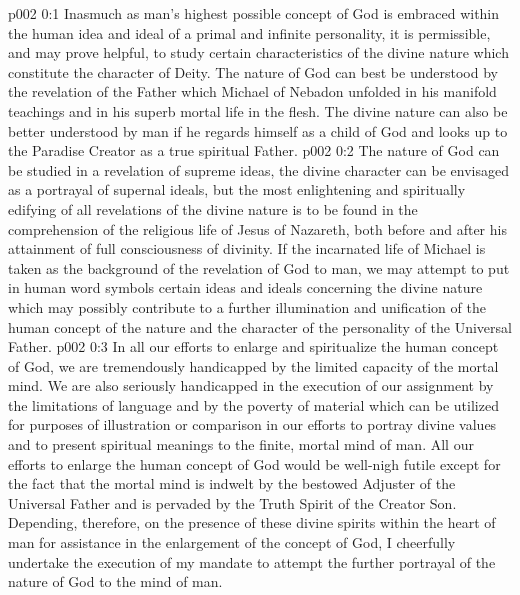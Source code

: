 \author{Divine Counsellor}
\vs p002 0:1 Inasmuch as man’s highest possible concept of God is embraced within the human idea and ideal of a primal and infinite personality, it is permissible, and may prove helpful, to study certain characteristics of the divine nature which constitute the character of Deity. The nature of God can best be understood by the revelation of the Father which Michael of Nebadon unfolded in his manifold teachings and in his superb mortal life in the flesh. The divine nature can also be better understood by man if he regards himself as a child of God and looks up to the Paradise Creator as a true spiritual Father.
\vs p002 0:2 The nature of God can be studied in a revelation of supreme ideas, the divine character can be envisaged as a portrayal of supernal ideals, but the most enlightening and spiritually edifying of all revelations of the divine nature is to be found in the comprehension of the religious life of Jesus of Nazareth, both before and after his attainment of full consciousness of divinity. If the incarnated life of Michael is taken as the background of the revelation of God to man, we may attempt to put in human word symbols certain ideas and ideals concerning the divine nature which may possibly contribute to a further illumination and unification of the human concept of the nature and the character of the personality of the Universal Father.
\vs p002 0:3 In all our efforts to enlarge and spiritualize the human concept of God, we are tremendously handicapped by the limited capacity of the mortal mind. We are also seriously handicapped in the execution of our assignment by the limitations of language and by the poverty of material which can be utilized for purposes of illustration or comparison in our efforts to portray divine values and to present spiritual meanings to the finite, mortal mind of man. All our efforts to enlarge the human concept of God would be well\hyp{}nigh futile except for the fact that the mortal mind is indwelt by the bestowed Adjuster of the Universal Father and is pervaded by the Truth Spirit of the Creator Son. Depending, therefore, on the presence of these divine spirits within the heart of man for assistance in the enlargement of the concept of God, I cheerfully undertake the execution of my mandate to attempt the further portrayal of the nature of God to the mind of man.
